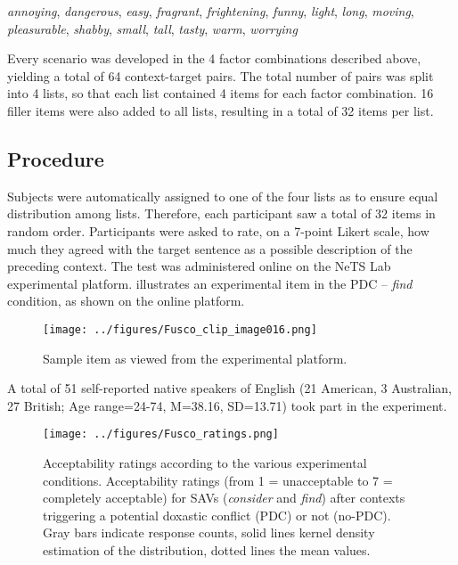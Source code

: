 \documentclass[output=paper,colorlinks,citecolor=brown]{langscibook}
\begin{document}
\ea \textit{annoying}, \textit{dangerous}, \textit{easy}, \textit{fragrant}, \textit{frightening}, \textit{funny}, \textit{light},  \textit{long}, \textit{moving}, \textit{pleasurable}, \textit{shabby}, \textit{small}, \textit{tall}, \textit{tasty}, \textit{warm},  \textit{worrying}
\z

Every scenario was developed in the 4 factor combinations described above, yielding a total of 64 context-target pairs. The total number of pairs was split into 4 lists, so that each list contained 4 items for each factor combination. 16 filler items were also added to all lists, resulting in a total of 32 items per list.

\subsection{Procedure}
\label{sec:procedure:Fusco}

Subjects were automatically assigned to one of the four lists as to ensure equal distribution among lists. Therefore, each participant saw a total of 32 items in random order. Participants were asked to rate, on a 7-point Likert scale, how much they agreed with the target sentence as a possible description of the preceding context. The test was administered online on the NeTS Lab experimental platform.  illustrates an experimental item in the PDC – \textit{find} condition, as shown on the online platform.

\begin{figure}
\texttt{[image: ../figures/Fusco\_clip\_image016.png]}
\caption{Sample item as viewed from the experimental platform.}
\label{fig:sample_item:Fusco}
\end{figure}

A total of 51 self-reported native speakers of English (21 American, 3 Australian, 27 British; Age range=24-74, M=38.16, SD=13.71) took part in the experiment.

\begin{figure}
\texttt{[image: ../figures/Fusco\_ratings.png]}
\caption{Acceptability ratings according to the various experimental conditions. Acceptability ratings (from 1 = unacceptable to 7 = completely acceptable) for SAVs (\textit{consider} and \textit{find}) after contexts triggering a potential doxastic conflict (PDC) or not (no-PDC). Gray bars indicate response counts, solid lines kernel density estimation of the distribution, dotted lines the mean values.}
\label{fig:ratings:Fusco}
\end{figure}
\end{document}
